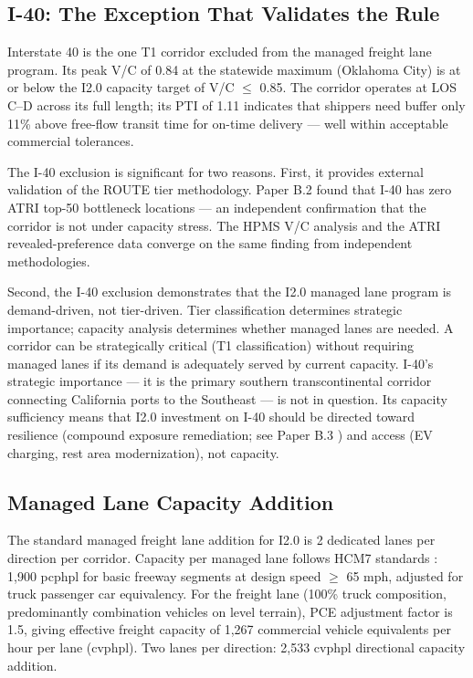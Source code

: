 \subsection{I-40: The Exception That Validates the Rule}

Interstate 40 is the one T1 corridor excluded from the managed freight lane program. Its peak V/C of 0.84 at the statewide maximum (Oklahoma City) is at or below the I2.0 capacity target of V/C $\leq$ 0.85. The corridor operates at LOS C--D across its full length; its PTI of 1.11 indicates that shippers need buffer only 11\% above free-flow transit time for on-time delivery --- well within acceptable commercial tolerances.

The I-40 exclusion is significant for two reasons. First, it provides external validation of the ROUTE tier methodology. Paper B.2 \citep{ROUTE_B2} found that I-40 has zero ATRI top-50 bottleneck locations --- an independent confirmation that the corridor is not under capacity stress. The HPMS V/C analysis and the ATRI revealed-preference data converge on the same finding from independent methodologies.

Second, the I-40 exclusion demonstrates that the I2.0 managed lane program is demand-driven, not tier-driven. Tier classification determines strategic importance; capacity analysis determines whether managed lanes are needed. A corridor can be strategically critical (T1 classification) without requiring managed lanes if its demand is adequately served by current capacity. I-40's strategic importance --- it is the primary southern transcontinental corridor connecting California ports to the Southeast --- is not in question. Its capacity sufficiency means that I2.0 investment on I-40 should be directed toward resilience (compound exposure remediation; see Paper B.3 \citep{ROUTE_B3}) and access (EV charging, rest area modernization), not capacity.

\subsection{Managed Lane Capacity Addition}

The standard managed freight lane addition for I2.0 is 2 dedicated lanes per direction per corridor. Capacity per managed lane follows HCM7 standards \citep{HCM7}: 1,900 pcphpl for basic freeway segments at design speed $\geq$ 65 mph, adjusted for truck passenger car equivalency. For the freight lane (100\% truck composition, predominantly combination vehicles on level terrain), PCE adjustment factor is 1.5, giving effective freight capacity of 1,267 commercial vehicle equivalents per hour per lane (cvphpl). Two lanes per direction: 2,533 cvphpl directional capacity addition.

